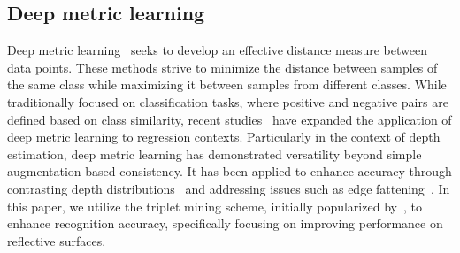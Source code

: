 \subsection{Deep metric learning}
\label{sec:rel_deep_metric}
Deep metric learning~\citep{chen2020simple, chen2021exploring, khosla2020supervised} seeks to develop an effective distance measure between data points.
These methods strive to minimize the distance between samples of the same class while maximizing it between samples from different classes.
While traditionally focused on classification tasks, where positive and negative pairs are defined based on class similarity, recent studies~\citep{spurr2021self, wang2022contrastive, zha2024rank} have expanded the application of deep metric learning to regression contexts.
Particularly in the context of depth estimation, deep metric learning has demonstrated versatility beyond simple augmentation-based consistency.
It has been applied to enhance accuracy through contrasting depth distributions~\citep{fan2023contrastive, choi2024depth} and addressing issues such as edge fattening~\citep{chen2023self}.
In this paper, we utilize the triplet mining scheme, initially popularized by~\citet{schroff2015facenet}, to enhance recognition accuracy, specifically focusing on improving performance on reflective surfaces.